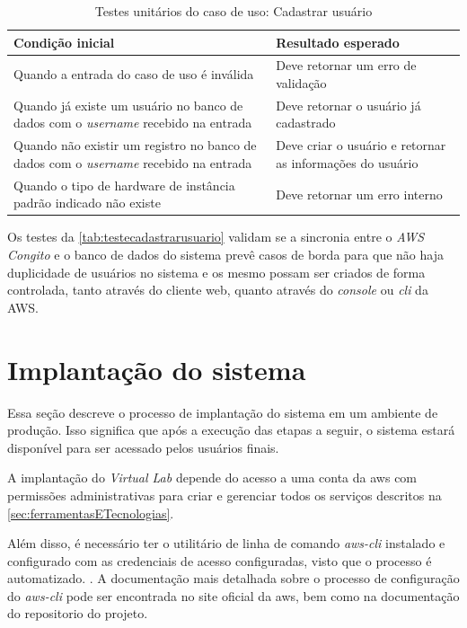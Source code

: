 \begin{table}[h]
\caption{Testes unitários do caso de uso: Cadastrar usuário}
\label{tab:testecadastrarusuario}
\begin{tabularx}{\textwidth}{p{} p{}}
\toprule
\textbf{Condição inicial} & \textbf{Resultado esperado} \\ \midrule

Quando a entrada do caso de uso é inválida & Deve retornar um erro de validação \\ \hline

Quando já existe um usuário no banco de dados com o \textit{username} recebido na entrada & Deve retornar o usuário já cadastrado \\ \hline

Quando não existir um registro no banco de dados com o \textit{username} recebido na entrada & Deve criar o usuário e retornar as informações do usuário \\

Quando o tipo de hardware de instância padrão indicado não existe & Deve retornar um erro interno \\

\bottomrule
\end{tabularx}
\end{table}

Os testes da \autoref{tab:testecadastrarusuario} validam se a sincronia entre o \textit{AWS Congito} e o banco de dados do sistema prevê casos de borda para que não haja duplicidade de usuários no sistema e os mesmo possam ser criados de forma controlada, tanto através do cliente web, quanto através do \textit{console} ou \textit{cli} da AWS.

\section{Implanta\c{c}\~ao do sistema}
\label{sec:implantacaoDoSistema}

Essa seção descreve o processo de implantação do sistema em um ambiente de produção. Isso significa que após a execução das etapas a seguir, o sistema estará disponível para ser acessado pelos usuários finais.

A implantação do \textit{Virtual Lab} depende do acesso a uma conta da \gls{aws} com permissões administrativas para criar e gerenciar todos os serviços descritos na \autoref{sec:ferramentasETecnologias}. 

Além disso, é necessário ter o utilitário de linha de comando \textit{aws-cli} instalado e configurado com as credenciais de acesso configuradas, visto que o processo é automatizado. \citep{awsclidocs}. A documentação mais detalhada sobre o processo de configuração do \textit{aws-cli} pode ser encontrada no site oficial da \gls{aws}, bem como na documentação do repositorio do projeto.

